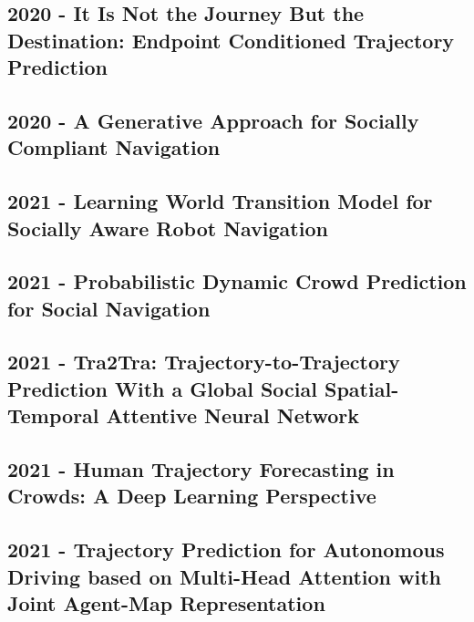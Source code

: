 \cite{salzmann2020trajectron++}

\subsection*{2020 - It Is Not the Journey But the Destination: Endpoint Conditioned Trajectory Prediction}

\cite{mangalam2020not}

\subsection*{2020 - A Generative Approach for Socially Compliant Navigation}

\cite{tsai2020generative}

\subsection*{2021 - Learning World Transition Model for Socially Aware Robot Navigation}

\cite{cui2021learning}

\subsection*{2021 - Probabilistic Dynamic Crowd Prediction for Social Navigation}

\cite{kiss2021probabilistic}

\subsection*{2021 - Tra2Tra: Trajectory-to-Trajectory Prediction With a Global Social Spatial-Temporal Attentive Neural Network}

\cite{xu2021tra2tra}

\subsection*{2021 - Human Trajectory Forecasting in Crowds: A Deep Learning Perspective}

\cite{kothari2021human}

\subsection*{2021 - Trajectory Prediction for Autonomous Driving based on Multi-Head Attention with Joint Agent-Map Representation}

\cite{messaoud2021trajectory}


